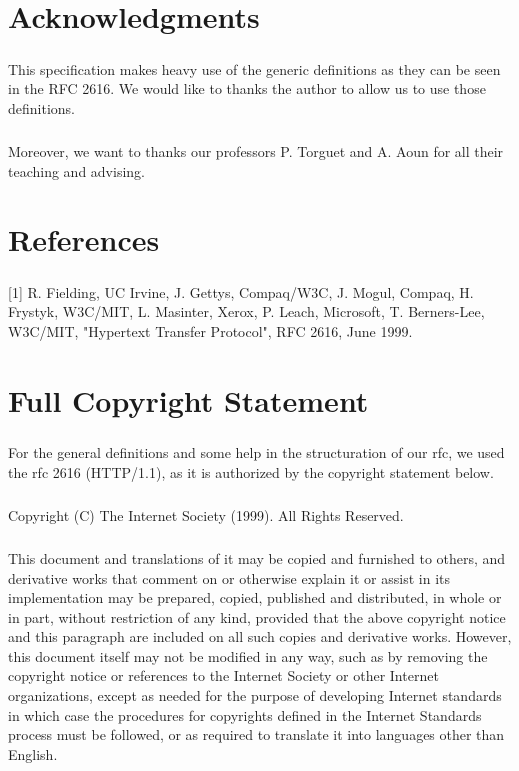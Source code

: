     \clearpage
\chapter{Acknowledgments}
        \paragraph{}
This specification makes heavy use of the generic definitions as they
can be seen in the RFC 2616. We would like to thanks the author to
allow us to use those definitions.
        \paragraph{}
Moreover, we want to thanks our professors P. Torguet and A. Aoun for
all their teaching and advising.


    \clearpage
\chapter{References}
        \paragraph{}
   [1] R. Fielding, UC Irvine, J. Gettys, Compaq/W3C, J. Mogul, Compaq,
       H. Frystyk, W3C/MIT, L. Masinter, Xerox, P. Leach, Microsoft,
       T. Berners-Lee, W3C/MIT, "Hypertext Transfer Protocol", RFC 2616,
       June 1999.


    \clearpage
\chapter{Full Copyright Statement}
        \paragraph{}
For the general definitions and some help in the structuration of our
rfc, we used the rfc 2616 (HTTP/1.1), as it is authorized by the
copyright statement below.
        \paragraph{}
Copyright (C) The Internet Society (1999).  All Rights Reserved.
        \paragraph{}
This document and translations of it may be copied and furnished to
others, and derivative works that comment on or otherwise explain it
or assist in its implementation may be prepared, copied, published
and distributed, in whole or in part, without restriction of any
kind, provided that the above copyright notice and this paragraph are
included on all such copies and derivative works.  However, this
document itself may not be modified in any way, such as by removing
the copyright notice or references to the Internet Society or other
Internet organizations, except as needed for the purpose of
developing Internet standards in which case the procedures for
copyrights defined in the Internet Standards process must be
followed, or as required to translate it into languages other than
English.
